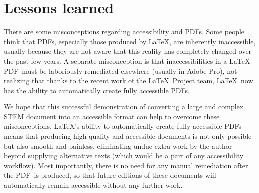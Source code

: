 \documentclass{article}
\makeatletter
\newcommand{\SMC}{%
 \ifdefined\@currsize  %
  \ifx\@currsize\normalsize\small\else
   \ifx\@currsize\small\footnotesize\else
    \ifx\@currsize\footnotesize\scriptsize\else
     \ifx\@currsize\large\normalsize\else
      \ifx\@currsize\Large\large\else
       \ifx\@currsize\LARGE\Large\else
        \ifx\@currsize\scriptsize\tiny\else
         \ifx\@currsize\tiny\tiny\else
          \ifx\@currsize\huge\LARGE\else
           \ifx\@currsize\Huge\huge\else
            \small\SMC@unknown@warning
 \fi\fi\fi\fi\fi\fi\fi\fi\fi\fi\fi
}
\newcommand*{\acro}[1]{{\SMC #1}\@}
\newcommand{\PDF}{\acro{PDF}}
\makeatother
\begin{document}
\section{Lessons learned}



There are some misconceptions regarding accessibility and \PDF s.
Some people think that \PDF s, especially those produced by \LaTeX,
are inherently inaccessible,
usually because they are not aware that
this reality has completely changed over the past few years.
A separate misconception is that inaccessibilities in a \LaTeX\ \PDF\ must
be laboriously remediated elsewhere (usually in Adobe Pro),
not realizing that thanks to the recent work of the \LaTeX\ Project team,
\LaTeX\ now has the ability to automatically create fully accessible \PDF s.

We hope that this successful demonstration of converting a large
and complex \acro{STEM} document into an accessible format can help to
overcome these misconceptions.
\LaTeX's ability to automatically create fully accessible \PDF s
means that producing high quality and accessible documents is
not only possible but also smooth and painless,
eliminating
undue extra work by the author beyond supplying alternative texts
(which would be a part of any accessibility workflow).
Most importantly, there is no need for any manual remediation after the
\PDF\ is produced, so that future editions of these documents will
automatically remain accessible without any further work.
\bigskip
\end{document}
